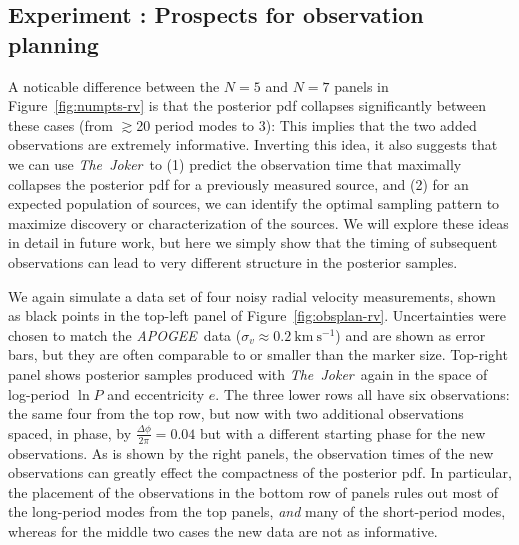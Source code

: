 \documentclass[manuscript, letterpaper]{aastex6}
\newcommand{\project}[1]{\textsl{#1}}
\newcommand{\acronym}[1]{{\small{#1}}}
\newcommand{\apogee}{\project{\acronym{APOGEE}}}
\newcommand{\samplername}{\project{The~Joker}}
\newcommand{\figname}{Figure}
\newcommand{\kms}{\mathrm{km}~\mathrm{s}^{-1}}
\newcounter{expcounter}
\begin{document}
\subsection{Experiment : Prospects for observation planning}
\label{sec:obsplan}

A noticable difference between the $N=5$ and $N=7$ panels in
\figname~\ref{fig:numpts-rv} is that the posterior pdf collapses significantly
between these cases (from $\gtrsim$20 period modes to 3):
This implies that the two added observations are extremely informative.
Inverting this idea, it also suggests that we can use \samplername\ to (1)
predict the observation time that maximally collapses the posterior pdf for a
previously measured source, and (2) for an expected population of sources, we
can identify the optimal sampling pattern to maximize discovery or
characterization of the sources.
We will explore these ideas in detail in future work, but here we simply show
that the timing of subsequent observations can lead to very different
structure in the posterior samples.

We again simulate a data set of four noisy radial velocity measurements, shown
as black points in the top-left panel of \figname~\ref{fig:obsplan-rv}.
Uncertainties were chosen to match the \apogee\ data ($\sigma_v \approx
0.2~\kms$) and are shown as error bars, but they are often comparable to or
smaller than the marker size.
Top-right panel shows posterior samples produced with \samplername\ again in the
space of log-period $\ln P$ and eccentricity $e$.
The three lower rows all have six observations: the same four from the top row,
but now with two additional observations spaced, in phase, by $\frac{\Delta
\phi}{2 \pi} = 0.04$ but with a different starting phase for the new
observations.
As is shown by the right panels, the observation times of the new observations
can greatly effect the compactness of the posterior pdf.
In particular, the placement of the observations in the bottom row of panels
rules out most of the long-period modes from the top panels, \emph{and} many of
the short-period modes, whereas for the middle two cases the new data are not as
informative.
\end{document}
